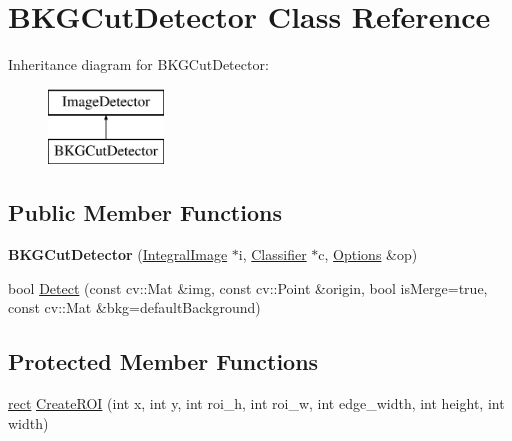 \hypertarget{classBKGCutDetector}{}\section{B\+K\+G\+Cut\+Detector Class Reference}
\label{classBKGCutDetector}
Inheritance diagram for B\+K\+G\+Cut\+Detector\+:\begin{figure}[H]
\begin{center}
\leavevmode
\includegraphics[height=2.000000cm]{classBKGCutDetector}
\end{center}
\end{figure}
\subsection*{Public Member Functions}
\begin{DoxyCompactItemize}
\item 
\hypertarget{classBKGCutDetector_ae2e7fe9cbafab49107aa9e28f05f4822}{}{\bfseries B\+K\+G\+Cut\+Detector} (\hyperlink{classIntegralImage}{Integral\+Image} $\ast$i, \hyperlink{classClassifier}{Classifier} $\ast$c, \hyperlink{structOptions}{Options} \&op)\label{classBKGCutDetector_ae2e7fe9cbafab49107aa9e28f05f4822}

\item 
bool \hyperlink{classBKGCutDetector_ab1e2f37a3436e58197f1429085677b8f}{Detect} (const cv\+::\+Mat \&img, const cv\+::\+Point \&origin, bool is\+Merge=true, const cv\+::\+Mat \&bkg=default\+Background)
\end{DoxyCompactItemize}
\subsection*{Protected Member Functions}
\begin{DoxyCompactItemize}
\item 
\hyperlink{structrect}{rect} \hyperlink{classBKGCutDetector_a2d0179ff253ad09c1549c8437e07736f}{Create\+R\+O\+I} (int x, int y, int roi\+\_\+h, int roi\+\_\+w, int edge\+\_\+width, int height, int width)
\end{DoxyCompactItemize}
